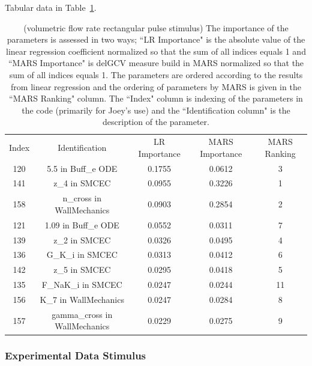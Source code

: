 \documentclass[12pt]{article}
\numberwithin{equation}{section}
\begin{document}
Tabular data in Table~\ref{qoi_vol_flow_rec}.

\begin{table}[h]
\centering
\begin{tabular}{ccccc}
Index & Identification & LR Importance & MARS Importance & MARS Ranking \\
   120 & 5.5 in Buff\_e ODE & 0.1755 & 0.0612 & 3\\
   141 & z\_4 in SMCEC &  0.0955 & 0.3226 & 1\\
   158 & n\_cross in WallMechanics & 0.0903 & 0.2854 & 2\\
   121 & 1.09 in Buff\_e ODE & 0.0552 & 0.0311 & 7\\
   139 & z\_2 in SMCEC & 0.0326 & 0.0495 & 4\\
   136 & G\_K\_i in SMCEC & 0.0313 & 0.0412 & 6\\
   142 & z\_5 in SMCEC & 0.0295 & 0.0418 & 5\\
   135 & F\_NaK\_i in SMCEC & 0.0247 & 0.0244 & 11\\
   156 & K\_7 in WallMechanics & 0.0247 & 0.0284 & 8\\
   157 & gamma\_cross in WallMechanics & 0.0229 & 0.0275 & 9
\end{tabular}
\caption{(volumetric flow rate rectangular pulse stimulus) The importance of the parameters is assessed in two ways; ``LR Importance" is the absolute value of the linear regression coefficient normalized so that the sum of all indices equals 1 and ``MARS Importance" is delGCV measure build in MARS normalized so that the sum of all indices equals 1. The parameters are ordered according to the results from linear regression and the ordering of parameters by MARS is given in the ``MARS Ranking" column. The ``Index" column is indexing of the parameters in the code (primarily for Joey's use) and the ``Identification column" is the description of the parameter.}
\label{qoi_vol_flow_rec}
\end{table}

\newpage

\subsubsection{Experimental Data Stimulus}
\end{document}
